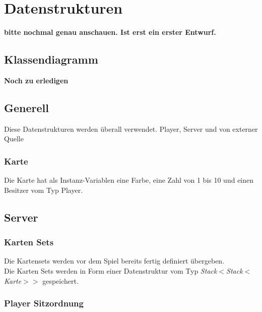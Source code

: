 \section{Datenstrukturen} 
\color{red}
\textbf{bitte nochmal genau anschauen. Ist erst ein erster Entwurf.}
\color{black}


\subsection{Klassendiagramm}

\color{red}
\textbf{Noch zu erledigen}
\color{black}

\subsection{Generell}

Diese Datenstrukturen werden überall verwendet. Player, Server und von externer Quelle

\subsubsection{Karte}

Die Karte hat als Instanz-Variablen eine Farbe, eine Zahl von 1 bis 10 und einen Besitzer vom Typ Player.



\subsection{Server}

\subsubsection{Karten Sets}

Die Kartensets werden vor dem Spiel bereits fertig definiert übergeben.\\[3mm]
Die Karten Sets werden in Form einer Datenstruktur vom Typ \textit{Stack$<$Stack$<$Karte$>>$} gespeichert.

\subsubsection{Player Sitzordnung}

